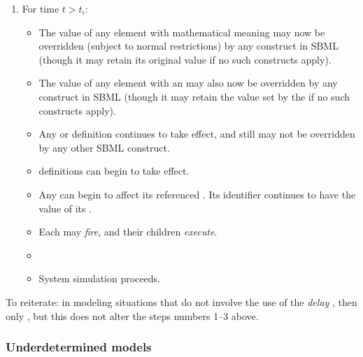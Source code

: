 \begin{enumerate}
\begin{itemize}
  \end{itemize}
  
\item For time $t > t_i$:
  \begin{itemize}

  \item The value of any element with mathematical meaning may now be overridden (subject to normal restrictions) by any construct in SBML (though it may retain its original value if no such constructs apply).

  \item The value of any element with an \InitialAssignment may also now be overridden by any construct in SBML (though it may retain the value set by the \InitialAssignment if no such constructs apply).

  \item Any \AssignmentRule or \AlgebraicRule definition continues to take effect, and still may not be overridden by any other SBML construct.

  \item \RateRule definitions can begin to take effect.

  \item Any \Reaction can begin to affect its referenced \Species.  Its identifier continues to have the value of its \KineticLaw.

  \item Each \Event may \emph{fire}, and their \EventAssignment children \emph{execute}.

  \item {}

  \item System simulation proceeds.

  \end{itemize}

\end{enumerate}  

To reiterate: in modeling situations that do not involve the use
of the \emph{delay} , then only ,
but this does not alter the steps numbers 1--3 above.

\subsubsection{Underdetermined models}
\label{sec:underdetermined}


